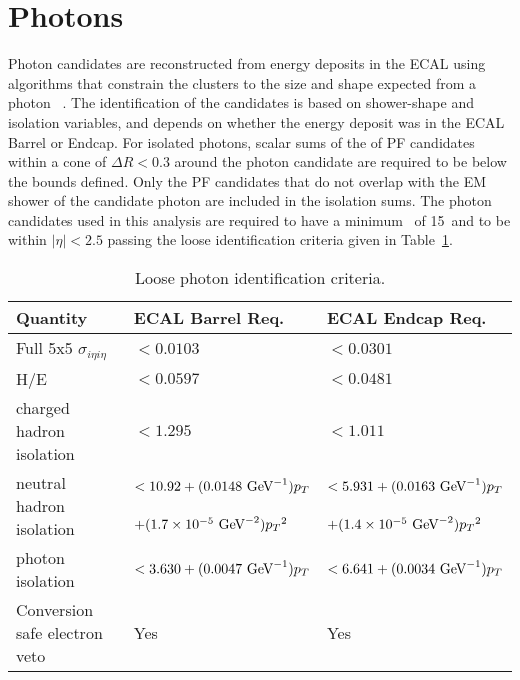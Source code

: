 \section{Photons}
Photon candidates are reconstructed from energy deposits in the ECAL using algorithms
that constrain the clusters to the size and shape expected from a photon~\cite{CMS:EGM-14-001} .
The identification of the candidates is based on shower-shape and isolation variables, and depends on
whether the energy deposit was in the ECAL Barrel or Endcap.
For isolated photons, scalar sums of the \pt of PF candidates within a cone of $\Delta R < 0.3$
around the photon candidate are required to be below the bounds defined. Only the PF candidates
that do not overlap with the EM shower of the candidate photon are included in the isolation sums.
The photon candidates used in this analysis are required to have a minimum \pt~of 15~\GeV and to  
be within $|\eta| < 2.5$ passing the loose identification criteria given in Table~\ref{tab:PhotonIDLoose}.

\begin{table}[htbp]
  \begin{center}
 {\footnotesize
  \begin{tabular} {lll}
\hline
Quantity                                   &  ECAL Barrel Req. & ECAL Endcap Req.  \\
\hline
Full 5x5 $\sigma_{i\eta i\eta}$            & $< 0.0103$ & $< 0.0301$     \\ \hline 
H/E                                        & $< 0.0597$ & $< 0.0481$     \\ \hline 
charged hadron isolation                   & $< 1.295$  & $< 1.011$      \\ \hline 
\multirow{2}{*}{neutral hadron isolation}  & $< 10.92 + (0.0148\,{\,\text{Ge\hspace{-.08em}V}}^{-1})p_T$          & $< 5.931 + (0.0163\,{\,\text{Ge\hspace{-.08em}V}}^{-1})p_T$        \\  
                                           & $+ (1.7\times 10^{-5}\,{\,\text{Ge\hspace{-.08em}V}}^{-2}){p_T}^2$   & $+(1.4\times 10^{-5}\,{\,\text{Ge\hspace{-.08em}V}}^{-2}){p_T}^2$  \\ \hline
photon isolation                           & $< 3.630 + (0.0047\,{\,\text{Ge\hspace{-.08em}V}}^{-1})p_T$          & $< 6.641 + (0.0034\,{\,\text{Ge\hspace{-.08em}V}}^{-1})p_T$        \\ \hline 
Conversion safe electron veto              & Yes & Yes           \\
\hline
\end{tabular}
}
\caption{Loose photon identification criteria.}
\label{tab:PhotonIDLoose}
  \end{center}
\end{table}


